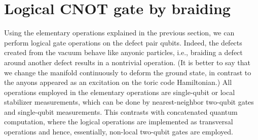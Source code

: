 \section{Logical CNOT gate by braiding}
\label{Sec:LogicalCNOT}
Using the elementary operations explained in the previous section, we can perform logical gate operations on the defect pair qubits.
Indeed, the defects created from the vacuum behave like anyonic particles, i.e., braiding a defect around another defect results in a nontrivial operation.
(It is better to say that we change the manifold continuously to deform the ground state, in contrast to the anyons appeared as an excitation on the toric code Hamiltonian.)
All operations employed in the elementary operations are single-qubit or local stabilizer measurements, which can be done by nearest-neighbor two-qubit gates and single-qubit measurements.
This contrasts with concatenated quantum computation, where the logical operations are implemented as transversal operations and hence, essentially, non-local two-qubit gates are employed.

